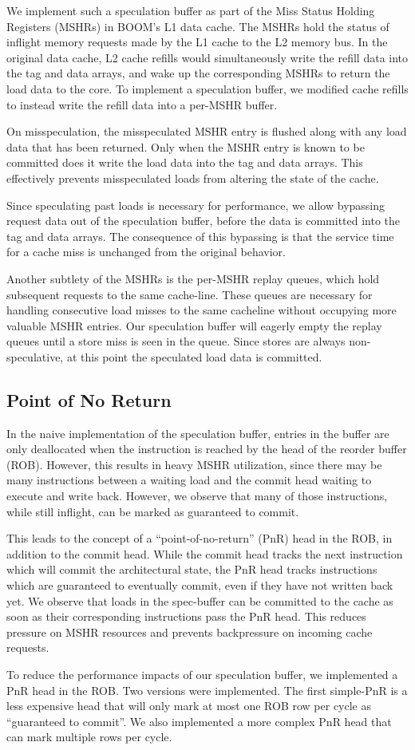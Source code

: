 We implement such a speculation buffer as part of the Miss Status Holding Registers (MSHRs) in BOOM's L1 data cache. The MSHRs hold the status of inflight memory requests made by the L1 cache to the L2 memory bus.
In the original data cache, L2 cache refills would simultaneously write the refill data into the tag and data arrays, and wake up the corresponding MSHRs to return the load data to the core.
To implement a speculation buffer, we modified cache refills to instead write the refill data into a per-MSHR buffer.

On misspeculation, the misspeculated MSHR entry is flushed along with any load data that has been returned. Only when the MSHR entry is known to be committed does it write the load data into the tag and data arrays. This effectively prevents misspeculated loads from altering the state of the cache.

Since speculating past loads is necessary for performance, we allow bypassing request data out of the speculation buffer, before the data is committed into the tag and data arrays. The consequence of this bypassing is that the service time for a cache miss is unchanged from the original behavior.

Another subtlety of the MSHRs is the per-MSHR replay queues, which hold subsequent requests to the same cache-line. These queues are necessary for handling consecutive load misses to the same cacheline without occupying more valuable MSHR entries. Our speculation buffer will eagerly empty the replay queues until a store miss is seen in the queue. Since stores are always non-speculative, at this point the speculated load data is committed.

\subsection{Point of No Return}
In the naive implementation of the speculation buffer, entries in the buffer are only deallocated when the instruction is reached by the head of the reorder buffer (ROB). However, this results in heavy MSHR utilization, since there may be many instructions between a waiting load and the commit head waiting to execute and write back. However, we observe that many of those instructions, while still inflight, can be marked as guaranteed to commit.

This leads to the concept of a ``point-of-no-return'' (PnR) head in the ROB, in addition to the commit head. While the commit head tracks the next instruction which will commit the architectural state, the PnR head tracks instructions which are guaranteed to eventually commit, even if they have not written back yet. We observe that loads in the spec-buffer can be committed to the cache as soon as their corresponding instructions pass the PnR head. This reduces pressure on MSHR resources and prevents backpressure on incoming cache requests.

To reduce the performance impacts of our speculation buffer, we implemented a PnR head in the ROB. Two versions were implemented. The first simple-PnR is a less expensive head that will only mark at most one ROB row per cycle as ``guaranteed to commit''. We also implemented a more complex PnR head that can mark multiple rows per cycle.
